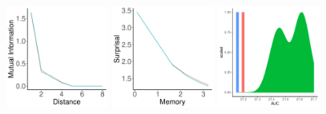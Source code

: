 \begin{figure}
	\begin{center}
\includegraphics[width=0.3\textwidth]{figures/Japanese-suffixes-byPhonemes-it-heldout.pdf}
\includegraphics[width=0.3\textwidth]{figures/Japanese-suffixes-byPhonemes-memsurp-heldout.pdf}
\includegraphics[width=0.3\textwidth]{figures/Japanese-suffixes-byPhonemes-auc-hist-heldout.pdf}


\end{center}
\end{figure}
